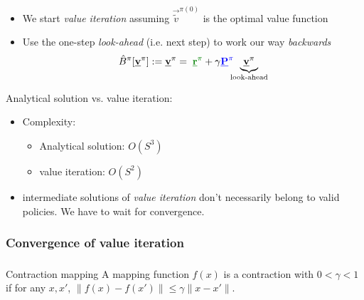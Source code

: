 \begin{frame}\frametitle{\subsubsecname}
    

\begin{itemize}
\item We start \emph{value iteration} assuming $\vec {\tilde v}^{\pi (0)}$ is the optimal value function
\item Use the one-step \emph{look-ahead} (i.e. next step) to work our way \emph{backwards}\\

	\begin{equation*}
		\hat B^\pi[\vec v^\pi] := \vec v^\pi
		= \; {\color{reward}\vec r^\pi} 
			+ \gamma {\color{trans}\vec P^\pi} \kern-1.2ex \underbrace{\vec v^\pi}_{\text{look-ahead}}
	\end{equation*}
\end{itemize}

Analytical solution vs. value iteration:

\begin{itemize}
\item Complexity: 
\begin{itemize}
\item Analytical solution: $O(S^{3})$
\item value iteration: $O(S^{2})$
\end{itemize}   
\item intermediate solutions of \emph{value iteration} don't necessarily belong to valid policies. We have to wait for convergence.
\end{itemize}

\end{frame}

\subsubsection{Convergence of value iteration}


\begin{frame} \frametitle{\subsubsecname}
    
	\begin{block}{Contraction mapping}
		\small
		A mapping function $f(x)$ is a contraction with $0 < \gamma < 1$ if for any $x, x'$, $\lVert f(x) - f(x') \rVert \le \gamma \lVert x - x' \rVert$.
	\normalsize
	\end{block}
    
    
\end{frame}

